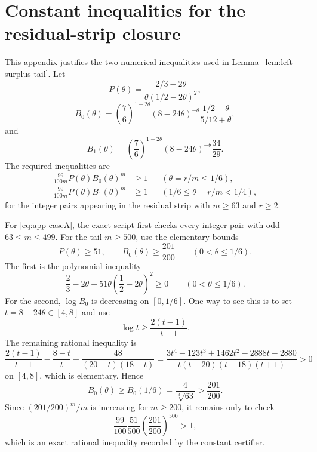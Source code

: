 \documentclass[11pt]{article}
\begin{document}
\section{Constant inequalities for the residual-strip closure}\label{app:constants}

This appendix justifies the two numerical inequalities used in Lemma~\ref{lem:left-surplus-tail}.  Let
\[
        P(\theta)=\frac{2/3-2\theta}{\theta(1/2-2\theta)^2},
\]
\[
        B_0(\theta)=
        \left(\frac76\right)^{1-2\theta}
        (8-24\theta)^{-\theta}
        \frac{1/2+\theta}{5/12+\theta},
\]
and
\[
        B_1(\theta)=
        \left(\frac76\right)^{1-2\theta}
        (8-24\theta)^{-\theta}
        \frac{34}{29}.
\]
The required inequalities are
\begin{align}
        \frac{99}{100m}P(\theta)B_0(\theta)^m&\ge1
        &&(\theta=r/m\le1/6),\label{eq:app-caseA}\\
        \frac{99}{100m}P(\theta)B_1(\theta)^m&\ge1
        &&(1/6\le\theta=r/m<1/4),\label{eq:app-caseB}
\end{align}
for the integer pairs appearing in the residual strip with $m\ge63$ and $r\ge2$.

For \eqref{eq:app-caseA}, the exact script first checks every integer pair with odd $63\le m\le499$.  For the tail $m\ge500$, use the elementary bounds
\[
        P(\theta)\ge51,
        \qquad
        B_0(\theta)\ge\frac{201}{200}
        \qquad(0<\theta\le1/6).
\]
The first is the polynomial inequality
\[
        \frac23-2\theta-51\theta\left(\frac12-2\theta\right)^2\ge0
        \qquad(0<\theta\le1/6).
\]
For the second, $\log B_0$ is decreasing on $[0,1/6]$.  One way to see this is to set $t=8-24\theta\in[4,8]$ and use
\[
        \log t\ge \frac{2(t-1)}{t+1}.
\]
The remaining rational inequality is
\[
\frac{2(t-1)}{t+1}-\frac{8-t}{t}+\frac{48}{(20-t)(18-t)}
=\frac{3t^4-123t^3+1462t^2-2888t-2880}{t(t-20)(t-18)(t+1)}>0
\]
on $[4,8]$, which is elementary.  Hence
\[
        B_0(\theta)\ge B_0(1/6)=\frac{4}{\sqrt[3]{63}}>\frac{201}{200}.
\]
Since $(201/200)^m/m$ is increasing for $m\ge200$, it remains only to check
\[
        \frac{99}{100}\frac{51}{500}\left(\frac{201}{200}\right)^{500}>1,
\]
which is an exact rational inequality recorded by the constant certifier.
\end{document}
